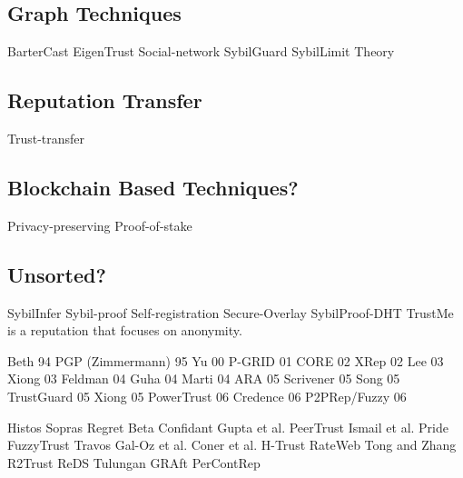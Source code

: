 \subsection{Graph Techniques}\label{sec:graph}
BarterCast\cite{meulpolder2009bartercast}
EigenTrust\cite{kamvar2003eigentrust}
Social-network\cite{viswanath2010analysis}
SybilGuard\cite{yu2006sybilguard}
SybilLimit\cite{yu2008sybillimit}
Theory\cite{seuken2011sybil}

\subsection{Reputation Transfer}
Trust-transfer\cite{seigneur2005trust}

\subsection{Blockchain Based Techniques?}
Privacy-preserving\cite{schaub2016trustless}
Proof-of-stake\cite{dennis2016rep}

\subsection{Unsorted?}
SybilInfer\cite{danezis2009sybilinfer}
Sybil-proof\cite{cheng2005sybilproof}
Self-registration\cite{dinger2006defending}
Secure-Overlay\cite{lua2007securing}
SybilProof-DHT\cite{lesniewski2010whanau}
TrustMe\cite{singh2003trustme} is a reputation that focuses on anonymity.

Beth 94\cite{beth1994valuation}
PGP (Zimmermann) 95\cite{zimmermann1995official}
Yu 00\cite{yu2000social}
P-GRID 01\cite{aberer2001p}
CORE 02\cite{michiardi2002core}
XRep 02\cite{damiani2002reputation}
Lee 03\cite{lee2003cooperative}
Xiong 03\cite{xiong2003reputation}
Feldman 04\cite{feldman2004robust}
Guha 04\cite{guha2004propagation}
Marti 04\cite{marti2004limited}
ARA 05\cite{ham2005ara}
Scrivener 05\cite{nandi2005scrivener}
Song 05\cite{song2005trusted}
TrustGuard 05\cite{srivatsa2005trustguard}
Xiong 05\cite{xiong2007countering}
PowerTrust 06\cite{zhou2007powertrust}
Credence 06\cite{walsh2006experience}
P2PRep/Fuzzy 06\cite{aringhieri2006fuzzy}

Histos
Sopras
Regret
Beta
Confidant
Gupta et al.
PeerTrust
Ismail et al.
Pride
FuzzyTrust
Travos
Gal-Oz et al.
Coner et al.
H-Trust
RateWeb
Tong and Zhang
R2Trust
ReDS
Tulungan
GRAft
PerContRep



